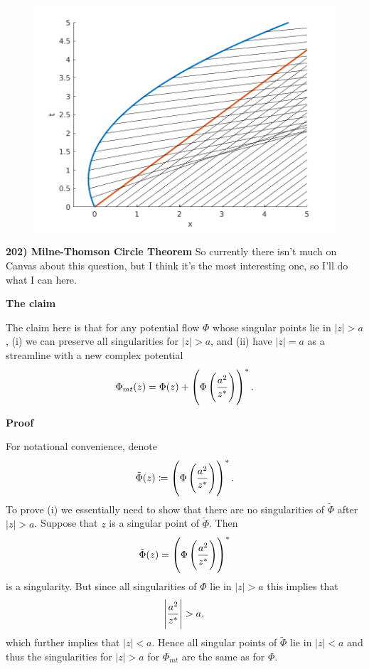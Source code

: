 \documentclass{article}
\def\ti#1{\tilde{#1}}
\begin{document}
\begin{figure}
    \includegraphics[width=40em]{as09fig1}
    \centering
\end{figure}

\newpage

\textbf{202) Milne-Thomson Circle Theorem}
So currently there isn't much on Canvas about this question, but I think
it's the most interesting one, so I'll do what I can here.

\textbf{The claim}

The claim here is that for any potential flow $\Phi$ whose singular
points lie in $|z| > a$, (i) we can preserve all singularities for $|z|
> a$, and (ii) have $|z| = a$ as a streamline with a new complex
potential
%
\begin{equation*}
    \Phi_{mt}(z) = \Phi(z) + \del{\Phi \del{\frac{a^2}{z^*}}}^*
    .
\end{equation*}

\textbf{Proof}

For notational convenience, denote
%
\begin{equation*}
    \ti{\Phi}(z) \coloneqq \del{\Phi \del{\frac{a^2}{z^*}}}^*
    .
\end{equation*}
%
To prove (i) we essentially need to show that there are no singularities
of $\ti\Phi$ after $|z| > a$. Suppose that $z$ is a singular point of
$\ti\Phi$. Then
%
\begin{equation*}
    \ti\Phi(z) = \del{\Phi \del{\frac{a^2}{z^*}}}^*
\end{equation*}
%
is a singularity. But since all singularities of $\Phi$ lie in $|z| >
a$ this implies that
%
\begin{equation*}
    \envert{\frac{a^2}{z^*}} > a
    ,
\end{equation*}
%
which further implies that $|z| < a$. Hence all singular points of
$\ti\Phi$ lie in $|z| < a$ and thus the singularities for $|z| > a$ for
$\Phi_{mt}$ are the same as for $\Phi$.
\end{document}
